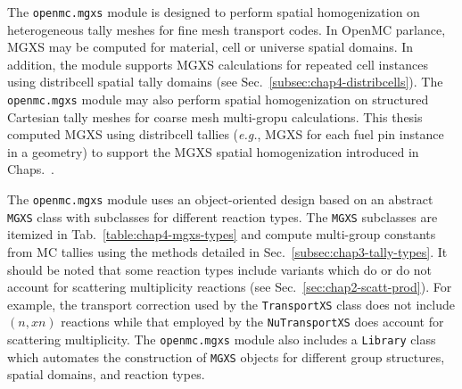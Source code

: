 The \texttt{openmc.mgxs} module is designed to perform spatial homogenization on heterogeneous tally meshes for fine mesh transport codes. In OpenMC parlance, \ac{MGXS} may be computed for material, cell or universe spatial domains. In addition, the module supports \ac{MGXS} calculations for repeated cell instances using distribcell spatial tally domains (see Sec.~\ref{subsec:chap4-distribcells}). The \texttt{openmc.mgxs} module may also perform spatial homogenization on structured Cartesian tally meshes for coarse mesh multi-gropu calculations. This thesis computed \ac{MGXS} using distribcell tallies (\textit{e.g.}, \ac{MGXS} for each fuel pin instance in a geometry) to support the \ac{MGXS} spatial homogenization introduced in Chaps.~.

The \texttt{openmc.mgxs} module uses an object-oriented design based on an abstract \texttt{MGXS} class with subclasses for different reaction types. The \texttt{MGXS} subclasses are itemized in Tab.~\ref{table:chap4-mgxs-types} and compute multi-group constants from \ac{MC} tallies using the methods detailed in Sec.~\ref{subsec:chap3-tally-types}. It should be noted that some reaction types include variants which do or do not account for scattering multiplicity reactions (see Sec.~\ref{sec:chap2-scatt-prod}). For example, the transport correction used by the \texttt{TransportXS} class does not include $(n,xn)$ reactions while that employed by the \texttt{NuTransportXS} does account for scattering multiplicity. The \texttt{openmc.mgxs} module also includes a \texttt{Library} class which automates the construction of \texttt{MGXS} objects for different group structures, spatial domains, and reaction types.

